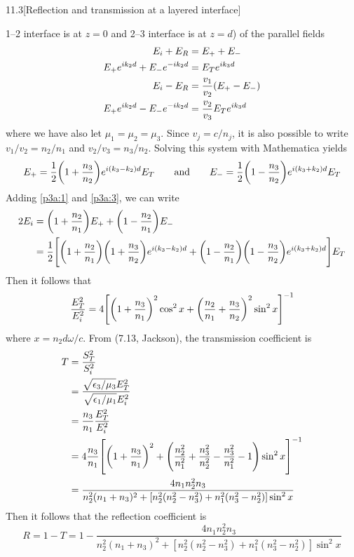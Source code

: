 \documentclass[12pt]{article}
\begin{document}
\begin{problem}{11.3}[Reflection and transmission at a layered interface]
\begin{solution}
1--2 interface is at $z=0$ and 2--3 interface is at $z=d$) of the parallel
fields
\begin{subequations}
    \begin{align}
        E_i+E_R&=E_++E_-\label{p3a:1}\\
        E_+e^{ik_2d}+E_-e^{-ik_2d}&=E_Te^{ik_3d}\label{p3a:2}\\
        E_i-E_R&=\frac{v_1}{v_2}\qty(E_+-E_-)\label{p3a:3}\\
        E_+e^{ik_2d}-E_-e^{-ik_2d}&=\frac{v_2}{v_3}E_Te^{ik_3d}\label{p3a:4}
    \end{align} 
\end{subequations}
where we have also let $\mu_1=\mu_2=\mu_3$. Since $v_j=c/n_j$, it is also 
possible to write $v_1/v_2=n_2/n_1$ and $v_2/v_3=n_3/n_2$. Solving this system
with Mathematica yields
\begin{equation}
    E_+=\frac12\qty(1+\frac{n_3}{n_2})e^{i(k_3-k_2)d}E_T\qquad\text{and}\qquad
    E_-=\frac12\qty(1-\frac{n_3}{n_2})e^{i(k_3+k_2)d}E_T
\end{equation}
Adding \eqref{p3a:1} and \eqref{p3a:3}, we can write
\begin{align}
    2E_i
    &=\qty(1+\frac{n_2}{n_1})E_++\qty(1-\frac{n_2}{n_1})E_-\notag\\
    &=\frac12\qty[\qty(1+\frac{n_2}{n_1})\qty(1+\frac{n_3}{n_2})e^{i(k_3-k_2)d}+\qty(1-\frac{n_2}{n_1})\qty(1-\frac{n_3}{n_2})e^{i(k_3+k_2)d}]E_T
\end{align}
Then it follows that
\begin{equation}
    \frac{E_T^2}{E_i^2}=4\qty[\qty(1+\frac{n_3}{n_1})^2\cos^2x+\qty(\frac{n_2}{n_1}+\frac{n_3}{n_2})^2\sin^2x]^{-1} 
\end{equation}
where $x=n_2d\omega/c$. From (7.13, Jackson), the transmission coefficient is
\begin{align}
    T&=\frac{S_T^2}{S_i^2}\notag\\
     &=\frac{\sqrt{\epsilon_3/\mu_3}E_T^2}{\sqrt{\epsilon_1/\mu_1}E_i^2}\notag\\
     &=\frac{n_3}{n_1}\frac{E_T^2}{E_i^2}\notag\\
     &=4\frac{n_3}{n_1}\qty[\qty(1+\frac{n_3}{n_1})^2+\qty(\frac{n_2^2}{n_1^2}+\frac{n_3^2}{n_2^2}-\frac{n_3^2}{n_1^2}-1)\sin^2x]^{-1}\notag\\
     &=\frac{4n_1n_2^2n_3}{n_2^2(n_1+n_3)^2+[n_2^2(n_2^2-n_3^2)+n_1^2(n_3^2-n_2^2)]\sin^2x}
\end{align}
Then it follows that the reflection coefficient is
\begin{equation}\label{p3:b}
    R=1-T=1-\frac{4n_1n_2^2n_3}{n_2^2(n_1+n_3)^2+[n_2^2(n_2^2-n_3^2)+n_1^2(n_3^2-n_2^2)]\sin^2x}
\end{equation}


\end{solution}
\end{problem}
\end{document}
